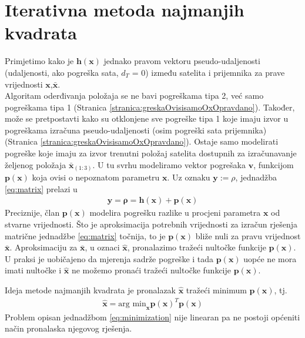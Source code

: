 \documentclass[a4paper,twoside,12pt]{memoir} %
\begin{document}
\section{Iterativna metoda najmanjih kvadrata}

Primjetimo kako je $\mathbf{h}(\mathbf{x})$ jednako pravom vektoru pseudo-udaljenosti (udaljenosti, ako pogreška sata, $d_T$ = 0) između
satelita i prijemnika za prave vrijednosti $\mathbf{x}$,$\bar{\mathbf{x}}$.\\
Algoritam oderđivanja položaja se ne bavi pogreškama tipa 2,
već samo pogreškama tipa 1 (Stranica \ref{stranica:greskaOvisisamoOxOpravdano}).
Također, može se pretpostavti kako su otklonjene sve pogreške tipa 1 koje imaju izvor 
u pogreškama izračuna pseudo-udaljenosti (osim pogreški sata prijemnika) (Stranica \ref{stranica:greskaOvisisamoOxOpravdano}).
Ostaje samo modelirati pogreške koje imaju za izvor trenutni položaj satelita dostupnih za
izračunavanje željenog položaja $\bar{\mathbf{x}}_{(1:3)}$.
U tu svrhu modeliramo vektor pogrešaka $\mathbf{v}$, funkcijom $\mathbf{p}(\mathbf{x})$ koja ovisi o nepoznatom parametru $\mathbf{x}$.
Uz oznaku $\mathbf{y} := \rho$, 
 jednadžba  \ref{eq:matrix} prelazi u
\begin{align}\label{eq:matrix2}
\mathbf{y} = \mathbf{\rho} = \mathbf{h}(\mathbf{x})+ \mathbf{p}(\mathbf{x})
\end{align}%
Preciznije,
član $\mathbf{p}(\mathbf{x})$ modelira pogrešku razlike u procjeni parametra $\mathbf{x}$ od stvarne vrijednosti.
Što je aproksimacija potrebnih vrijednosti za izračun rješenja matrične jednadžbe
\ref{eq:matrix} točnija, to je $\mathbf{p}(\mathbf{x})$ 
bliže nuli za pravu vrijednost $\bar{\mathbf{x}}$.
Aproksimaciju za $\bar{\mathbf{x}}$, u oznaci $\hat{\mathbf{x}}$, pronalazimo tražeći nultočke funkcije $\mathbf{p}(\mathbf{x})$.
U praksi je uobičajeno da mjerenja sadrže pogreške i tada $\mathbf{p}(\mathbf{x})$ uopće ne mora imati 
nultočke i $\hat{\mathbf{x}}$ ne možemo pronaći tražeći nultočke funkcije $\mathbf{p}(\mathbf{x})$.

Ideja metode najmanjih kvadrata je pronalazak $\hat{\mathbf{x}}$ tražeći minimum $\mathbf{p}(\mathbf{x})$, tj.
\begin{align}\label{eq:minimization}
	\hat{\mathbf{x}} = \text{arg min}_\mathbf{x} \mathbf{p}(\mathbf{x})^T\mathbf{p}(\mathbf{x})
\end{align}
Problem opisan jednadžbom \ref{eq:minimization} nije linearan pa
ne postoji općeniti način pronalaska njegovog rješenja.
\end{document}

